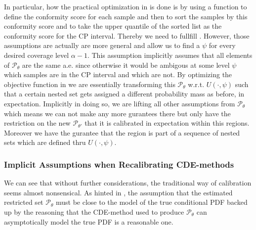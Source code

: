 In particular, how the practical optimization in  is done is by using a function to define the conformity score for each sample and then to sort the samples by this conformity score and to take the upper quantile of the sorted list as the conformity score for the CP interval. Thereby we need to fullfill . However, those assumptions are actually are more general and allow us to find a $\psi$ for every desired coverage level $\alpha - 1$. This assumption implicitly assumes that all elements of $\mathcal{P}_{\theta}$ are the same a.e. since otherwise it would be ambigous at some level $\psi$ which samples are in the CP interval and which are not. By optimizing the objective function in  we are essentially transforming this $\mathcal{P}_{\theta}$ w.r.t. $U(\cdot, \psi)$ such that a certain nested set gets assigned a different probability mass as before, in expectation. Implicitly in doing so, we are lifting all other assumptions from $\mathcal{P}_{\theta}$ which means we can not make any more gurantees there but only have the restriction on the new $\mathcal{P}_{\theta'}$ that it is calibrated in expectation within this regions. Moreover we have the gurantee that the region is part of a sequence of nested sets which are defined thru $U(\cdot, \psi)$.

\subsubsection{Implicit Assumptions when Recalibrating CDE-methods}
We can see that without further considerations, the traditional way of calibration seems almost nonsensical. As hinted in , the assumption that the estimated restricted set $\mathcal{P}_\theta$ must be close to the model of the true conditional PDF backed up by the reasoning that the CDE-method used to produce $\mathcal{P}_{\theta}$ can asymptotically model the true PDF is a reasonable one.

